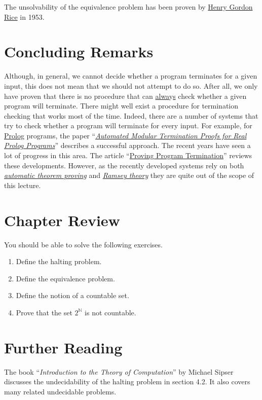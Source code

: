 \remarkEng
The unsolvability of the equivalence problem has been proven by \href{http://en.wikipedia.org/wiki/Henry_Gordon_Rice}{Henry Gordon Rice} \cite{rice:1953} in 1953.
\eox

\section{Concluding Remarks}
Although, in general, we cannot decide whether a program terminates for a given input, this does not mean
that we should not attempt to do so.  After all, we only have proven that there is no procedure that
can \underline{alwa}y\underline{s} check whether a given program will terminate.  There might well exist a
procedure for termination checking that works most of the time.  Indeed, there are a number of
systems that try to check whether a program will terminate for every input.  For example, for
\href{https://en.wikipedia.org/wiki/Prolog}{Prolog}
programs, the paper
``\href{http://link.springer.com/chapter/10.1007%2F3-540-61739-6_44}{\emph{Automated Modular Termination Proofs for Real Prolog Programs}}''
\cite{mueller:1996} describes a successful approach.  The recent years have seen a lot of progress in
this area.  The article 
``\href{http://dl.acm.org/citation.cfm?id=1941509}{{Proving Program Termination}}''
\cite{cook:2011} reviews these developments.  However, as the recently developed systems rely on both
\href{http://en.wikipedia.org/wiki/Automated_theorem_proving}{\emph{automatic theorem proving}} and
\href{http://en.wikipedia.org/wiki/Ramsey_theory}{\emph{Ramsey theory}} they are quite out of the
scope of this lecture.

\section{Chapter Review}
You should be able to solve the following exercises.
\begin{enumerate}
\item Define the halting problem.
\item Define the equivalence problem.
\item Define the notion of a countable set.
\item Prove that the set $2^{\mathbb{N}}$ is not countable.
\end{enumerate}


\section{Further Reading}
The book ``\emph{Introduction to the Theory of Computation}'' by Michael Sipser \cite{sipser:1996}
discusses the undecidability of the halting problem in section 4.2.  It also covers many related
undecidable problems.

